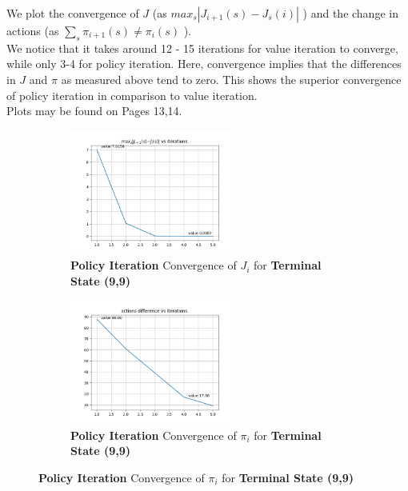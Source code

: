 We plot the convergence of $J$ (as $max_s | J_{i+1}(s) - J_s(i) | $ ) and the change in actions (as $\sum_s \pi_{i+1}(s) \neq \pi_i(s)$ ). \\

We notice that it takes around 12 - 15 iterations for value iteration to converge, while only 3-4 for policy iteration. Here, convergence implies that the differences in $J$ and $\pi$ as measured above tend to zero. This shows the superior convergence of policy iteration in comparison to value iteration. \\

Plots may be found on Pages 13,14.

\begin{figure}[h]
\begin{subfigure}
\centering
\includegraphics[angle=0,width=0.6\textwidth]{hw4/logs/policy_iter_t=99_N=20/convergence-difference-till-6.png}
\caption{ \textbf{Policy Iteration} Convergence of $J_i$ for \textbf{Terminal State (9,9)}}
\end{subfigure}

\begin{subfigure}
\centering
\includegraphics[angle=0,width=0.6\textwidth]{hw4/logs/policy_iter_t=99_N=20/actions-difference-till-6.png}
\caption{ \textbf{Policy Iteration} Convergence of $\pi_i$ for \textbf{Terminal State (9,9)}}
\end{subfigure}
\end{figure}

